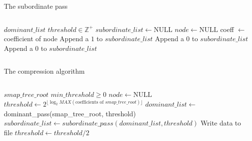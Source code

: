 \documentclass{beamer}
\begin{document}
\begin{frame}{The subordinate pass}
    \begin{columns}
        \begin{column}{0.7\textwidth}
            \begin{algorithm}[H]
                \caption{EZW}
                \label{alg:subpass}
                \scriptsize
                \begin{algorithmic}
                    \Require $dominant\_list$
                    \Require $threshold \in \mathbb{Z}^+$
                    \State $subordinate\_list \gets \text{NULL}$
                    \State $node \gets \text{NULL}$
                        \State coeff $\gets$ coefficient of node
                                \State Append a $1$ to $subordinate\_list$
                            \Else
                                \State Append a $0$ to $subordinate\_list$
                            \EndIf
                        \Else
                            \State Append a $0$ to $subordinate\_list$
                        \EndIf
                    \EndFor
                \end{algorithmic}
            \end{algorithm}
        \end{column}
    \end{columns}
\end{frame}

\begin{frame}{The compression algorithm}
    \begin{columns}
        \begin{column}{0.9\textwidth}
            \begin{algorithm}[H]
                \caption{EZW Compression}
                \label{alg:ezwcomp}
                \scriptsize
                \begin{algorithmic}
                    \Require $smap\_tree\_root$ 
                    \Require $min\_threshold \ge 0$
                    \State $node \gets \text{NULL}$
                    \State $threshold \gets 2^{\lfloor\log_2{MAX(\text{coefficients of } smap\_tree\_root)}\rfloor}$
                        \State $dominant\_list \gets$ dominant\_pass(smap\_tree\_root, threshold)
                        \State $subordinate\_list \gets subordinate\_pass(dominant\_list, threshold)$
                        \State Write data to file
                        \State $threshold \gets threshold/2$
                    \EndWhile
                \end{algorithmic}
            \end{algorithm}
        \end{column}
    \end{columns}
\end{frame}
\end{document}
